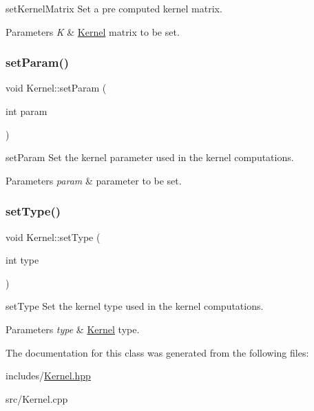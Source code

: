 set\+Kernel\+Matrix Set a pre computed kernel matrix. 


\begin{DoxyParams}{Parameters}
{\em K} & \mbox{\hyperlink{class_kernel}{Kernel}} matrix to be set. \\
\hline
\end{DoxyParams}
\mbox{\label{class_kernel_a4fe711ebdbc168be1733fbb8aea6cf92}} 
\subsubsection{\texorpdfstring{set\+Param()}{setParam()}}
{\footnotesize\ttfamily void Kernel\+::set\+Param (\begin{DoxyParamCaption}\item[{int}]{param }\end{DoxyParamCaption})}



set\+Param Set the kernel parameter used in the kernel computations. 


\begin{DoxyParams}{Parameters}
{\em param} & parameter to be set. \\
\hline
\end{DoxyParams}
\mbox{\label{class_kernel_ad01e209470accf44ea240078f39fb127}} 
\subsubsection{\texorpdfstring{set\+Type()}{setType()}}
{\footnotesize\ttfamily void Kernel\+::set\+Type (\begin{DoxyParamCaption}\item[{int}]{type }\end{DoxyParamCaption})}



set\+Type Set the kernel type used in the kernel computations. 


\begin{DoxyParams}{Parameters}
{\em type} & \mbox{\hyperlink{class_kernel}{Kernel}} type. \\
\hline
\end{DoxyParams}


The documentation for this class was generated from the following files\+:\begin{DoxyCompactItemize}
\item 
includes/\mbox{\hyperlink{_kernel_8hpp}{Kernel.\+hpp}}\item 
src/Kernel.\+cpp\end{DoxyCompactItemize}
